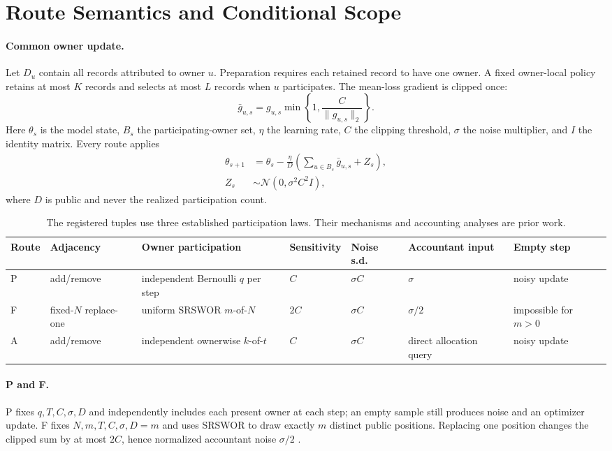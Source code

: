 \documentclass[letterpaper]{article}
\begin{document}
\section{Route Semantics and Conditional Scope}
\label{sec:routes}

\paragraph{Common owner update.}
Let $D_u$ contain all records attributed to owner $u$.  Preparation requires
each retained record to have one owner.  A fixed owner-local policy retains at
most $K$ records and selects at most $L$ records when $u$ participates.  The
mean-loss gradient is clipped once:
\[
 \bar g_{u,s}=g_{u,s}
 \min\!\left\{1,\frac{C}{\lVert g_{u,s}\rVert_2}\right\}.
\]
Here $\theta_s$ is the model state, $B_s$ the participating-owner set, $\eta$
the learning rate, $C$ the clipping threshold, $\sigma$ the noise multiplier,
and $I$ the identity matrix.
Every route applies
\[
\begin{aligned}
 \theta_{s+1}&=\theta_s-\frac{\eta}{D}
 \left(\sum_{u\in B_s}\bar g_{u,s}+Z_s\right),\\
 Z_s&\sim\mathcal N(0,\sigma^2C^2I),
\end{aligned}
\]
where $D$ is public and never the realized participation count.

\begin{table}[t]
\centering
\footnotesize
\setlength{\tabcolsep}{4pt}
\begin{tabular}{@{}lllllll@{}}
\toprule
Route & Adjacency & Owner participation & Sensitivity & Noise s.d. &
Accountant input & Empty step \\
\midrule
P & add/remove & independent Bernoulli $q$ per step & $C$ & $\sigma C$ &
$\sigma$ & noisy update \\
F & fixed-$N$ replace-one & uniform SRSWOR $m$-of-$N$ & $2C$ &
$\sigma C$ & $\sigma/2$ & impossible for $m>0$ \\
A & add/remove & independent ownerwise $k$-of-$t$ & $C$ &
$\sigma C$ & direct allocation query & noisy update \\
\bottomrule
\end{tabular}
\caption{The registered tuples use three established participation laws.
Their mechanisms and accounting analyses are prior work.}
\label{tab:supp-routes}
\end{table}

\paragraph{P and F.}
P fixes $q,T,C,\sigma,D$ and independently includes each present owner at
each step; an empty sample still produces noise and an optimizer update.  F
fixes $N,m,T,C,\sigma,D=m$ and uses SRSWOR to draw exactly $m$ distinct public
positions.
Replacing one position changes the clipped sum by at most $2C$, hence
normalized accountant noise $\sigma/2$ \citep{wang2019subsampled}.
\end{document}
